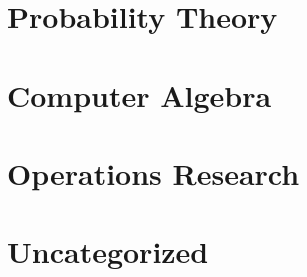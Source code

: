 \documentclass{report}
\begin{document}
\chapter{Probability Theory}
\renewcommand{\cat}{PT}




\chapter{Computer Algebra}
\renewcommand{\cat}{CP}


\chapter{Operations Research}
\renewcommand{\cat}{OR}


\chapter{Uncategorized}
\renewcommand{\cat}{UN}

\end{document}
